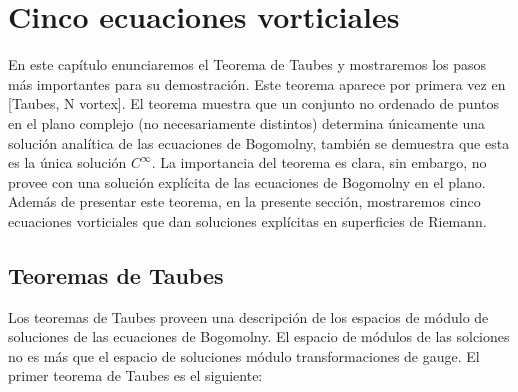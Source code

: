 
\chapter{Cinco ecuaciones vorticiales} %

\label{ch:taubes} %


En este capítulo enunciaremos el Teorema de Taubes y mostraremos los pasos más importantes para su demostración. Este teorema aparece por primera vez en [Taubes, N vortex]. El teorema muestra que un conjunto no ordenado de puntos en el plano complejo (no necesariamente distintos) determina únicamente una solución analítica de las ecuaciones de Bogomolny, también se demuestra que esta es la única solución $C^\infty$. La importancia del teorema es clara, sin embargo, no provee con una solución explícita de las ecuaciones de Bogomolny en el plano. Además de presentar este teorema, en la presente sección, mostraremos cinco ecuaciones vorticiales que dan soluciones explícitas en superficies de Riemann. 

\section{Teoremas de Taubes}
\label{sec:2.1}

Los teoremas de Taubes proveen una descripción de los espacios de módulo de soluciones de las ecuaciones de Bogomolny. El espacio de módulos de las solciones no es más que el espacio de soluciones módulo transformaciones de gauge. El primer teorema de Taubes es el siguiente:


